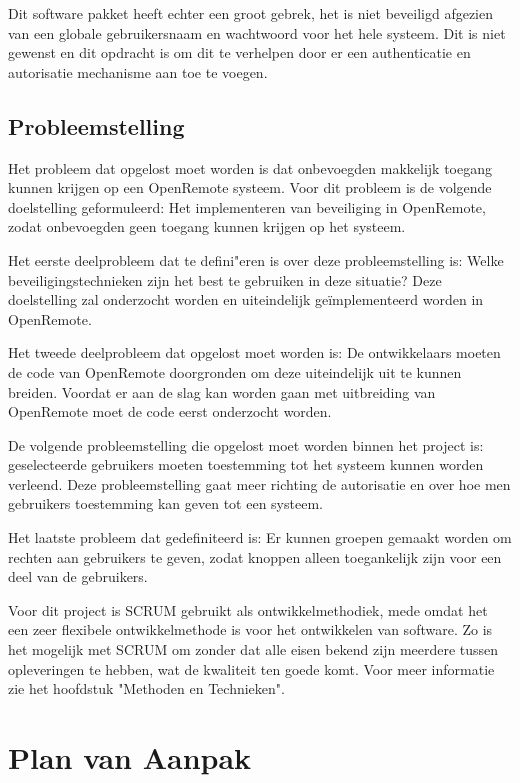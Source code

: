 \documentclass[]{article}
\begin{document}
Dit software pakket heeft echter een groot gebrek, het is niet beveiligd
afgezien van een globale gebruikersnaam en wachtwoord voor het hele
systeem. Dit is niet gewenst en dit opdracht is om dit te verhelpen door
er een authenticatie en autorisatie mechanisme aan toe te voegen.

\subsection{Probleemstelling}

Het probleem dat opgelost moet worden is dat onbevoegden makkelijk toegang
kunnen krijgen op een OpenRemote systeem. Voor dit probleem is de
volgende doelstelling geformuleerd: Het implementeren van beveiliging in
OpenRemote, zodat onbevoegden geen toegang kunnen krijgen op het systeem.

Het eerste deelprobleem dat te defini"eren is over deze probleemstelling is:
Welke beveiligingstechnieken zijn het best te gebruiken in deze situatie?
Deze doelstelling zal onderzocht worden en uiteindelijk ge\"implementeerd worden in OpenRemote.

Het tweede deelprobleem dat opgelost moet worden is: De ontwikkelaars
moeten de code van OpenRemote doorgronden om deze uiteindelijk uit te
kunnen breiden. Voordat er aan de slag kan worden gaan met uitbreiding van
OpenRemote moet de code eerst onderzocht worden.

De volgende probleemstelling die opgelost moet worden binnen het project
is: geselecteerde gebruikers moeten toestemming tot het systeem kunnen worden
verleend. Deze probleemstelling gaat meer richting de autorisatie en over
hoe men gebruikers toestemming kan geven tot een systeem.

Het laatste probleem dat gedefiniteerd is: Er kunnen groepen gemaakt worden om
rechten aan gebruikers te geven, zodat knoppen alleen toegankelijk zijn voor een deel van de gebruikers. 

Voor dit project is SCRUM gebruikt als ontwikkelmethodiek, mede omdat het een
zeer flexibele ontwikkelmethode is voor het ontwikkelen van software. Zo is het
mogelijk met SCRUM om zonder dat alle eisen bekend zijn meerdere tussen
opleveringen te hebben, wat de kwaliteit ten goede komt. Voor meer
informatie zie het hoofdstuk "Methoden en Technieken".

\newpage
\section{Plan van Aanpak}
\end{document}
